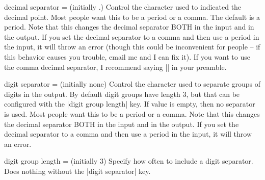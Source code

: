 \documentclass{ltxdoc}
\begin{document}
\begin{key}{decimal separator =  (initially .)}
Control the character used to indicated the decimal point. Most people want this to be a period or a comma. The default is a period. Note that this changes the decimal separator BOTH in the input and in the output. If you set the decimal separator to a comma and then use a period in the input, it will throw an error (though this could be inconvenient for people -- if this behavior causes you trouble, email me and I can fix it).
If you want to use the comma decimal separator, I recommend saying || in your preamble.
\begin{tcblisting}{}
 \quad
{}
\end{tcblisting}
\end{key}

\begin{key}{digit separator =  (initially none)}
Control the character used to separate groups of digits in the output.
By default digit groups have length 3, but that can be configured with the |digit group length| key.
If value is empty, then no separator is used.
Most people want this to be a period or a comma.
Note that this changes the decimal separator BOTH in the input and in the output. If you set the decimal separator to a comma and then use a period in the input, it will throw an error.
\begin{tcblisting}{}
 \quad
{}
\end{tcblisting}
\end{key}

\begin{key}{digit group length =  (initially 3)}
Specify how often to include a digit separator. Does nothing without the |digit separator| key.
\begin{tcblisting}{}
 \quad
{} \quad
{}
\end{tcblisting}
\end{key}
\end{document}
